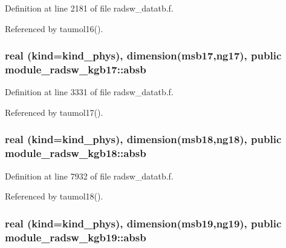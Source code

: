 Definition at line 2181 of file radsw\+\_\+datatb.\+f.



Referenced by taumol16().

\subsubsection[{\texorpdfstring{absb}{absb}}]{\setlength{\rightskip}{0pt plus 5cm}real (kind=kind\+\_\+phys), dimension(msb17,ng17), public module\+\_\+radsw\+\_\+kgb17\+::absb}\hypertarget{group__module__radsw__main_gaef407d13a88f5e1bfd20652ab3010e2f}{}\label{group__module__radsw__main_gaef407d13a88f5e1bfd20652ab3010e2f}


Definition at line 3331 of file radsw\+\_\+datatb.\+f.



Referenced by taumol17().

\subsubsection[{\texorpdfstring{absb}{absb}}]{\setlength{\rightskip}{0pt plus 5cm}real (kind=kind\+\_\+phys), dimension(msb18,ng18), public module\+\_\+radsw\+\_\+kgb18\+::absb}\hypertarget{group__module__radsw__main_ga858680db0ee5e9a599639844a91f8f06}{}\label{group__module__radsw__main_ga858680db0ee5e9a599639844a91f8f06}


Definition at line 7932 of file radsw\+\_\+datatb.\+f.



Referenced by taumol18().

\subsubsection[{\texorpdfstring{absb}{absb}}]{\setlength{\rightskip}{0pt plus 5cm}real (kind=kind\+\_\+phys), dimension(msb19,ng19), public module\+\_\+radsw\+\_\+kgb19\+::absb}\hypertarget{group__module__radsw__main_gad1171c012a1615c4b98eb3e95276867d}{}\label{group__module__radsw__main_gad1171c012a1615c4b98eb3e95276867d}


